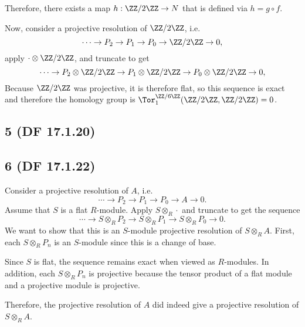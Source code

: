 \documentclass[12pt, reqno]{amsart}
\begin{document}
Therefore, there exists a map $h : \ZZ / 2\ZZ \to N$ that is defined via
$h = g \circ f$.

Now, consider a projective resolution of $\ZZ / 2\ZZ$, i.e.
\[ 
\cdots \to P_2 \to P_1 \to P_0 \to \ZZ / 2\ZZ \to 0,
\] 
apply $\cdot \otimes \ZZ / 2\ZZ$, and truncate to get
\[ 
\cdots \to P_2 \otimes \ZZ /2\ZZ \to P_1 \otimes \ZZ / 2\ZZ 
	\to P_0 \otimes \ZZ/2\ZZ \to 0,
\] 
Because $\ZZ / 2\ZZ$ was projective, it is therefore flat, so this sequence is
exact and therefore the homology group is 
$\Tor_1^{\ZZ/6\ZZ} (\ZZ / 2\ZZ , \ZZ / 2\ZZ) = 0$.

\subsection*{5 (DF 17.1.20)}
\subsection*{6 (DF 17.1.22)}

Consider a projective resolution of $A$, i.e.
\[ 
\cdots \to P_2 \to P_1 \to P_0 \to A \to 0.
\] 
Assume that $S$ is a flat $R$-module. Apply $S \otimes_R \cdot$ and truncate to
get the sequence
\[ 
\cdots \to S \otimes_R P_2 \to S \otimes_R P_1 \to S\otimes_R P_0  \to 0.
\] 
We want to show that this is an $S$-module projective resolution of $S
\otimes_R A$. First, each $S \otimes_R P_n$ is an $S$-module since this is a
change of base. 

Since $S$ is flat, the sequence remains exact when viewed as $R$-modules.
In addition, each $S \otimes_R P_n$ is projective because the tensor product of
a flat module and a projective module is projective.

Therefore, the projective resolution of $A$ did indeed
give a projective resolution of $S \otimes_R A$.
\end{document}
